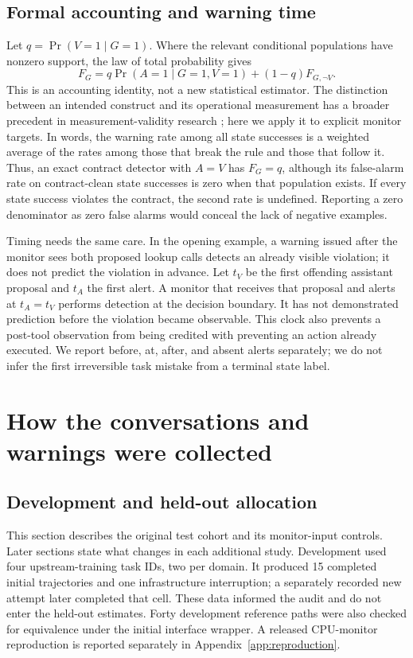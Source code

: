 \documentclass[10pt]{article}
\begin{document}
\subsection{Formal accounting and warning time}
Let $q=\Pr(V=1\mid G=1)$. Where the relevant conditional populations have nonzero support, the law of total probability gives
\begin{equation}
 F_G=q\Pr(A=1\mid G=1,V=1)+(1-q)F_{G,\neg V}.
 \label{eq:decomposition}
\end{equation}
This is an accounting identity, not a new statistical estimator. The distinction between an intended construct and its operational measurement has a broader precedent in measurement-validity research \citep{jacobs2021measurement}; here we apply it to explicit monitor targets. In words, the warning rate among all state successes is a weighted average of the rates among those that break the rule and those that follow it. Thus, an exact contract detector with $A=V$ has $F_G=q$, although its false-alarm rate on contract-clean state successes is zero when that population exists. If every state success violates the contract, the second rate is undefined. Reporting a zero denominator as zero false alarms would conceal the lack of negative examples.

Timing needs the same care. In the opening example, a warning issued after the monitor sees both proposed lookup calls detects an already visible violation; it does not predict the violation in advance. Let $t_V$ be the first offending assistant proposal and $t_A$ the first alert. A monitor that receives that proposal and alerts at $t_A=t_V$ performs detection at the decision boundary. It has not demonstrated prediction before the violation became observable. This clock also prevents a post-tool observation from being credited with preventing an action already executed. We report before, at, after, and absent alerts separately; we do not infer the first irreversible task mistake from a terminal state label.

\section{How the conversations and warnings were collected}
\label{sec:protocol}
\subsection{Development and held-out allocation}
This section describes the original test cohort and its monitor-input controls. Later sections state what changes in each additional study. Development used four upstream-training task IDs, two per domain. It produced 15 completed initial trajectories and one infrastructure interruption; a separately recorded new attempt later completed that cell. These data informed the audit and do not enter the held-out estimates. Forty development reference paths were also checked for equivalence under the initial interface wrapper. A released CPU-monitor reproduction is reported separately in Appendix~\ref{app:reproduction}.
\end{document}
